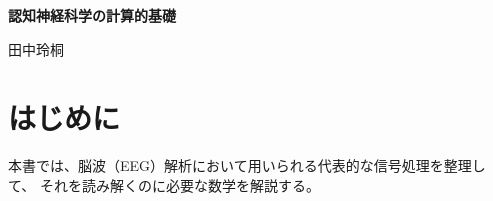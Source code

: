 \documentclass[a4paper,12pt]{ltjsbook}
\begin{document}
\begin{titlepage}
\centering

\vspace*{6cm}

{\Huge \bfseries 認知神経科学の計算的基礎 \par}

\vspace{2cm}

{\Large 田中玲桐 \par}

\vfill

\end{titlepage}

\chapter*{はじめに}

本書では、脳波（EEG）解析において用いられる代表的な信号処理を整理して、
それを読み解くのに必要な数学を解説する。

\clearpage

\tableofcontents

\end{document}
